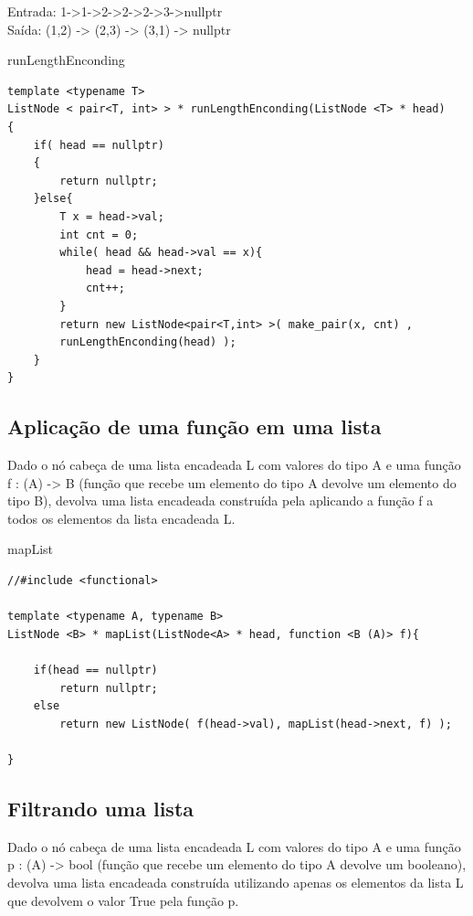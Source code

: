 Entrada: 1->1->2->2->2->3->nullptr\\
Saída: (1,2) -> (2,3) -> (3,1) -> nullptr \\


\begin{listing}[!ht]
\caption{runLengthEnconding}

\begin{verbatim}
template <typename T>
ListNode < pair<T, int> > * runLengthEnconding(ListNode <T> * head)
{
    if( head == nullptr)
    {
        return nullptr;
    }else{
        T x = head->val;
        int cnt = 0;
        while( head && head->val == x){
            head = head->next;
            cnt++;
        }
        return new ListNode<pair<T,int> >( make_pair(x, cnt) ,
        runLengthEnconding(head) );
    }
}

\end{verbatim}
\end{listing}

\subsection{Aplicação de uma função em uma lista}


Dado o nó cabeça de uma lista encadeada L com valores do tipo A e uma função f : (A) -> B (função que recebe um elemento do tipo A devolve um elemento do tipo B), devolva uma lista encadeada construída pela aplicando a função f a todos os elementos da lista encadeada L.

\newpage

\begin{listing}[!ht]
\caption{mapList}
\begin{verbatim}
//#include <functional>
 
template <typename A, typename B>
ListNode <B> * mapList(ListNode<A> * head, function <B (A)> f){

    if(head == nullptr)
        return nullptr;
    else
        return new ListNode( f(head->val), mapList(head->next, f) );

}
\end{verbatim}
\end{listing}


\subsection{Filtrando uma lista}

Dado o nó cabeça de uma lista encadeada L com valores do tipo A e uma função p : (A) -> bool (função que recebe um elemento do tipo A devolve um booleano), devolva uma lista encadeada construída utilizando apenas os elementos da lista L que devolvem o valor True pela função p.

